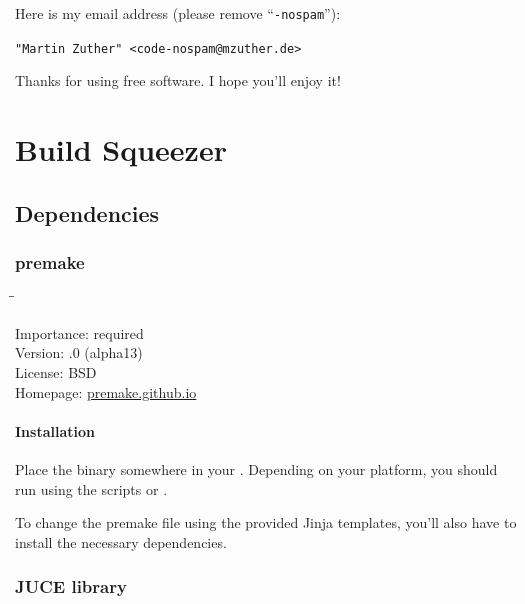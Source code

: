 \newpage %

Here is my email address (please remove ``\texttt{-nospam}''):

\begin{center}
  \texttt{"Martin Zuther" <code-nospam@mzuther.de>}
\end{center}

Thanks for using free software.  I hope you'll enjoy it!

\appendix

\chapter{Build Squeezer}
\label{chap:build_squeezer}

\section{Dependencies}
\label{sec:dependencies}

\subsection{premake}
\label{sec:dependencies_premake}

\begin{tabbing}
  \hspace*{6em}\=\=\kill

  Importance:  \> required \\
  Version:     .0 (alpha13) \\
  License:     \> BSD \\
  Homepage:    \> \href{https://premake.github.io/}{premake.github.io}
\end{tabbing}

\subsubsection{Installation}

Place the binary somewhere in your .  Depending on your
platform, you should run  using the scripts
 or .

To change the premake file using the provided Jinja templates, you'll
also have to install the necessary dependencies.

\subsection{JUCE library}

